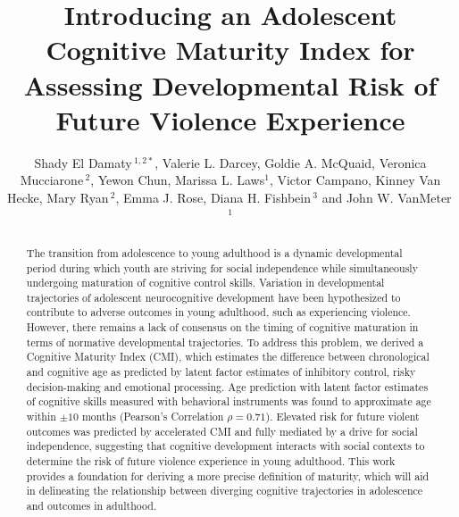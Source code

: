 \documentclass[utf8]{frontiersSCNS} %
\def\firstAuthorLast{El Damaty {et~al.}} %
\def\Authors{Shady El Damaty\,$^{1,2*}$, Valerie L. Darcey, Goldie A. McQuaid, Veronica Mucciarone\,$^{2}$, Yewon Chun, Marissa L. Laws$^{1}$, Victor Campano, Kinney Van Hecke, Mary Ryan\,$^{2}$, Emma J. Rose, Diana H. Fishbein\,$^{3}$ and John W. VanMeter\,$^{1}$}
\begin{document}
\onecolumn
{}
\title{Introducing an Adolescent Cognitive Maturity Index for Assessing Developmental Risk of Future Violence Experience} 
\author[\firstAuthorLast ]{\Authors} %
\address{} %
\correspondance{} %
\extraAuth{}
\maketitle \begin{abstract}

The transition from adolescence to young adulthood is a dynamic developmental period during which youth are striving for social independence while simultaneously undergoing maturation of cognitive control skills. Variation in developmental trajectories of adolescent neurocognitive development have been hypothesized to contribute to adverse outcomes in young adulthood, such as experiencing violence. However, there remains a lack of consensus on the timing of cognitive maturation in terms of normative developmental trajectories. To address this problem, we derived a Cognitive Maturity Index (CMI), which estimates the difference between chronological and cognitive age as predicted by latent factor estimates of inhibitory control, risky decision-making and emotional processing. Age prediction with latent factor estimates of cognitive skills measured with behavioral instruments was found to approximate age within $\pm 10$ months (Pearson's Correlation $\rho=0.71$). Elevated risk for future violent outcomes was predicted by accelerated CMI and fully mediated by a drive for social independence, suggesting that cognitive development interacts with social contexts to determine the risk of future violence experience in young adulthood. This work provides a foundation for deriving a more precise definition of maturity, which will aid in delineating the relationship between diverging cognitive trajectories in adolescence and outcomes in adulthood.

\section{}


\end{abstract}
\end{document}

